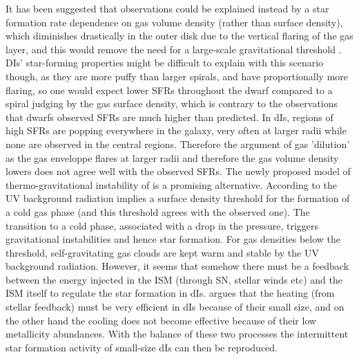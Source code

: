 \documentclass[preprint]{aastex}
\begin{document}
It has been suggested that observations could be explained instead by a star 
formation rate dependence on gas volume density (rather than surface density), 
which diminishes drastically in the outer disk
due to the vertical flaring of the gas layer, and this would remove the need
for a large-scale gravitational threshold \citep{f02}. DIs' star-forming properties
might be difficult to explain with this scenario though, as they are more puffy
than larger spirals, and have proportionally more flaring, so one would expect
lower SFRs throughout the dwarf compared to a spiral judging by
the gas surface density, which is contrary to the observations that dwarfs observed
SFRs are much higher than predicted. In dIs, regions of high SFRs 
are popping everywhere in the galaxy, very often at larger radii while
  none are observed in the central regions. Therefore the argument
  of gas 'dilution' as the gas enveloppe flares at larger radii and therefore
  the gas volume density lowers does not agree well with the observed SFRs.
The newly proposed model of thermo-gravitational instability of \citet{s04} is 
a promising alternative. According to \citet{s04} the UV background radiation 
implies a surface density threshold for the formation of a cold gas phase
(and this threshold agrees with the observed one). The transition to a cold phase,
associated with a drop in the pressure, triggers gravitational instabilities and
hence star formation. For gas densities below the threshold, 
self-gravitating gas clouds
are kept warm and stable by the UV background radiation.
However, it seems that somehow there must be a feedback between the energy 
injected in the
ISM (through SN, stellar winds etc) and the ISM itself to regulate the star
formation in dIs. \citet{hi00} argues that the heating (from stellar feedback)
must be very efficient in dIs because of their small size, and on the other hand
the cooling does not become effective because of their low metallicity abundances.  
With the balance of these two processes the intermittent 
star formation activity of small-size dIs can then be reproduced.
\end{document}
